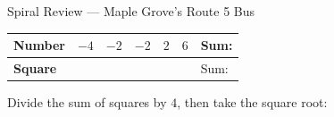 \documentclass[12pt]{article}
\begin{document}
\begin{notesbox}{Spiral Review --- Maple Grove's Route 5 Bus}
\begin{enumerate}[leftmargin=1.8em, itemsep=22pt, topsep=6pt]
        \vspace{2pt}
        {\centering\renewcommand{\arraystretch}{2.6}
        \begin{tabular}{@{} l C{1.3cm} C{1.3cm} C{1.3cm} C{1.3cm} C{1.3cm} C{2.2cm} @{}}
        \toprule
        \textbf{Number} & $-4$ & $-2$ & $-2$ & $2$ & $6$ & Sum:  \\
        \midrule
        \textbf{Square} &  &  &  &  &  & Sum:  \\
        \bottomrule
        \end{tabular}\par}

        \vspace{8pt}
        Divide the sum of squares by $4$, then take the square root: 

\end{enumerate}
\end{notesbox}
\end{document}
